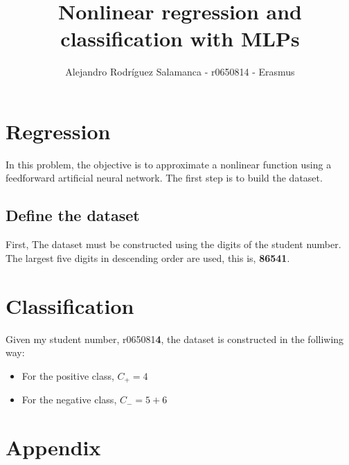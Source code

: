 \documentclass[10pt]{article}
\author{Alejandro Rodríguez Salamanca - r0650814 - Erasmus}
\date{}
\title{Nonlinear regression and classification with MLPs}
\begin{document}
\maketitle

\begin{multicols}{2}

  \section*{Regression}
  In this problem, the objective is to approximate a nonlinear function using
  a feedforward artificial neural network. The first step is to build the dataset.
  \subsection*{Define the dataset}
  First, 
  The dataset must be constructed using the digits of the student number. The
  largest five digits in descending order are used, this is, \textbf{86541}.
  
  

  \section*{Classification}
  Given my student number, r065081\textbf{4}, the dataset is constructed in the folliwing way:
  \begin{itemize}
    \item For the positive class, $C_{+} = 4$
    \item For the negative class, $C_{-} = 5+6$
  \end{itemize}
  

\end{multicols}

  \section*{Appendix}
\end{document}
